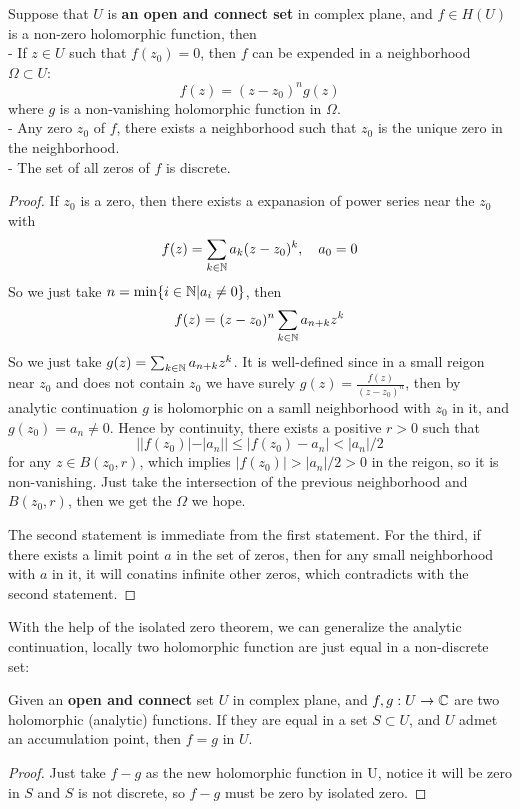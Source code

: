 \documentclass[en,geye,blue,normal,12pt,bibend=bibtex]{elegantnote}
\begin{document}
\begin{theorem}
        Suppose that \(U\) is \textbf{an open and connect set} in complex plane, and \(f \in H(U)\) is a non-zero holomorphic function, then\\
        - If \(z \in U\) such that \(f(z_0) = 0\), then \(f\) can be expended in a neighborhood \(\Omega \subset U\):
        \[f(z) = (z-z_0)^ng(z)\]
        where \(g\) is a non-vanishing holomorphic function in \(\Omega\). \\
        - Any zero \(z_0\) of \(f\), there exists a neighborhood such that \(z_0\) is the unique zero in the neighborhood. \\
        - The set of all zeros of \(f\) is discrete.

    \begin{proof}
            If \(z_0\) is a zero, then there exists a expanasion of power series near the \(z_0\) with 
            \[f(z) = \sum_{k \in \mathbb{N}}a_k(z-z_0)^k, \quad a_0 =0\]
            So we just take \(n = \min\{i \in \mathbb{N}| a_i \neq 0\}\), then 
            \[f(z) = (z-z_0)^n\sum_{k \in \mathbb{N}}a_{n+k}z^k\]
            So we just take \(g(z) = \sum_{k \in \mathbb{N}}a_{n+k}z^k\). It is well-defined since in a small reigon near \(z_0\) and does not contain \(z_0\) we have surely \(g(z) = \frac{f(z)}{(z-z_0)^n}\), then by analytic continuation \(g\) is holomorphic on a samll neighborhood with \(z_0\) in it, and \(g(z_0) = a_n \neq 0\). Hence by continuity, there exists a positive \(r>0\) such that 
            \[||f(z_0)|-|a_n|| \leq |f(z_0)-a_n| < |a_n| /2\]
            for any \(z \in B(z_0,r)\), which implies \(|f(z_0)| > |a_n|/2 > 0\) in the reigon, so it is non-vanishing. Just take the intersection of the previous neighborhood and \(B(z_0,r)\), then we get the \(\Omega\) we hope.

            The second statement is immediate from the first statement. For the third, if there exists a limit point \(a\) in the set of zeros, then for any small neighborhood with \(a\) in it, it will conatins infinite other zeros, which contradicts with the second statement.
    \end{proof}
\end{theorem}

    With the help of the isolated zero theorem, we can generalize the analytic continuation, locally two holomorphic function are just equal in a non-discrete set:

    \begin{theorem}
        Given an \textbf{open and connect} set \(U\) in complex plane, and \(f,g: U \to \mathbb{C}\) are two holomorphic (analytic) functions. If they are equal in a set \(S \subset U\), and \(U\) admet an accumulation point, then \(f=g\) in \(U\).

        \begin{proof}
            Just take \(f-g\) as the new holomorphic function in U, notice it will be zero in \(S\) and \(S\) is not discrete, so \(f-g\) must be zero by isolated zero.
        \end{proof}
    \end{theorem}
\end{document}
